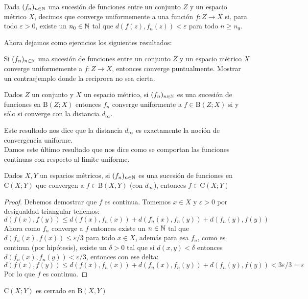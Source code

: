 \documentclass[12pt,a4paper]{book}
\begin{document}
\begin{defi} Dada $(f_n)_{{n} \in \mathbb{N}}$ una sucesión de funciones entre un conjunto $Z$ y un espacio métrico $X$, decimos que converge uniformemente a una función $f:Z \rightarrow X$ si, para todo $\varepsilon >0$, existe un $n_0 \in \mathbb{N}$ tal que $ d(f(z),f_n(z)) < \varepsilon$ para todo $n \geq n_0$.
\end{defi}
Ahora dejamos como ejercicios los siguientes resultados:
\begin{ej} Si $(f_n)_{{n} \in \mathbb{N}}$ una sucesión de funciones entre un conjunto $Z$ y un espacio métrico $X$ converge uniformemente a $f:Z \rightarrow X$, entonces converge puntualmente. Mostrar un contraejemplo donde la reciproca no sea cierta.
\end{ej}
\begin{ej}
Dados $Z$ un conjunto y $X$ un espacio métrico, si $(f_n)_{{n} \in \mathbb{N}}$ es una sucesión de funciones en $\mathrm{B}(Z;X)$ entonces $f_n$ converge uniformente a $f \in \mathrm{B}(Z;X)$ si y sólo si converge con la distancia $d_\infty$.
\end{ej}
Este resultado nos dice que la distancia $d_\infty$ es exactamente la noción de convergencia uniforme.\\[0.5cm]
Damos este último resultado que nos dice como se comportan las funciones continuas con respecto al límite uniforme.
\begin{teo} Dados $X,Y$ un espacios métricos, si $(f_n)_{{n} \in \mathbb{N}}$ es una sucesión de funciones en $\mathrm{C}(X;Y)$ que convergen a $f\in \mathrm{B}(X,Y)$ (con $d_\infty$), entonces $f \in \mathrm{C}(X;Y)$
\begin{proof}
Debemos demostrar que $f$ es continua. Tomemos $x \in X$ y $\varepsilon > 0$ por desigualdad triangular tenemos:
$$d(f(x),f(y)) \leq d(f(x),f_n(x)) + d(f_n(x),f_n(y))+ d(f_n(y),f(y))$$
Ahora como $f_n$ converge a $f$ entonces existe un $n \in \mathbb{N}$ tal que $d(f_n(x),f(x)) \leq \varepsilon/3$ para todo $x \in X$, además para esa $f_n$, como es continua (por hipótesis), existe un $\delta>0$  tal que si $d(x,y)<\delta$ entonces $d(f_n(x),f_n(y))<\varepsilon/3$, entonces con ese delta:
$$d(f(x),f(y)) \leq d(f(x),f_n(x)) + d(f_n(x),f_n(y))+ d(f_n(y),f(y))< 3 \varepsilon/3 = \varepsilon$$
Por lo que $f$ es continua.
\end{proof}
\end{teo}
\begin{cor}
$\mathrm{C}(X;Y)$ es cerrado en $\mathrm{B}(X,Y)$
\end{cor}

\ifx\isEmbedded\undefined
\end{document}
